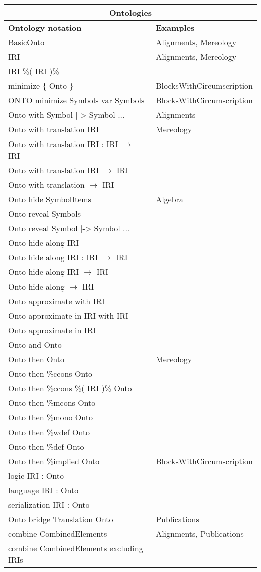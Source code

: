 \documentclass[%
\ifpretendfinal
final%
\else
draft%
\fi,
a4paper,
wd]{isov2}
\begin{document}
\begin{tabular}{|l|l|}\hline
\multicolumn{2}{|c|}{\textbf{Ontologies}}\\\hline
\textbf{Ontology notation} & \textbf{Examples} \\\hline
BasicOnto  & Alignments, Mereology \\\hline
IRI  & Alignments, Mereology \\\hline
IRI \%( IRI )\%  &  \\\hline
minimize \{ Onto \}  & BlocksWithCircumscription \\\hline
ONTO minimize Symbols var Symbols  & BlocksWithCircumscription \\\hline
Onto with Symbol |-> Symbol ...  & Alignments \\\hline
Onto with translation IRI  & Mereology \\\hline
Onto with translation IRI : IRI $\to$ IRI  &  \\\hline
Onto with translation IRI $\to$ IRI  &  \\\hline
Onto with translation $\to$ IRI  &  \\\hline
Onto hide SymbolItems  &  Algebra \\\hline
Onto reveal Symbols  &  \\\hline
Onto reveal Symbol |-> Symbol ...  &  \\\hline
Onto hide along IRI  &  \\\hline
Onto hide along IRI : IRI $\to$ IRI  &  \\\hline
Onto hide along IRI $\to$ IRI  &  \\\hline
Onto hide along $\to$ IRI  &  \\\hline
Onto approximate with IRI   &  \\\hline
Onto approximate in IRI with IRI   &  \\\hline
Onto approximate in IRI  &  \\\hline
Onto and Onto   &  \\\hline
Onto then Onto  & Mereology \\\hline
Onto then \%ccons Onto  &  \\\hline
Onto then \%ccons \%( IRI )\% Onto  &  \\\hline
Onto then \%mcons Onto  &  \\\hline
Onto then \%mono Onto  &  \\\hline
Onto then \%wdef Onto  &  \\\hline
Onto then \%def Onto  &  \\\hline
Onto then \%implied Onto  &  BlocksWithCircumscription \\\hline
logic IRI : Onto  &  \\\hline
language IRI : Onto  &  \\\hline
serialization IRI : Onto  &  \\\hline
Onto bridge Translation Onto  & Publications \\\hline
combine CombinedElements  & Alignments, Publications \\\hline
combine CombinedElements excluding IRIs  &  \\\hline
\end{tabular}
\end{document}
